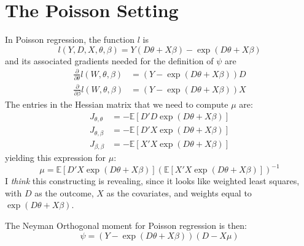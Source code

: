 \documentclass[11pt]{article}
\begin{document}
\section{The Poisson Setting}
In Poisson regression, the function $l$ is
\begin{equation*}
	l(Y, D, X, \theta, \beta) = Y(D\theta + X\beta) - \exp(D\theta + X\beta)
\end{equation*}
and its associated gradients needed for the definition of $\psi$ are
\begin{align*}
	\frac{\partial}{\partial \theta}l(W, \theta, \beta) &= (Y - \exp(D\theta + X\beta)) D \\
	\frac{\partial}{\partial \beta}l(W, \theta, \beta) &= (Y - \exp(D\theta + X\beta)) X
\end{align*}
The entries in the Hessian matrix that we need to compute $\mu$ are:
\begin{align*}
	J_{\theta, \theta} &= -\mathbb{E}\left[D'D\exp(D\theta + X\beta)\right] \\
	J_{\theta, \beta} &= -\mathbb{E}\left[D'X\exp(D\theta + X\beta)\right] \\
	J_{\beta, \beta} &= -\mathbb{E}\left[X'X\exp(D\theta + X\beta)\right]
\end{align*} 
yielding this expression for $\mu$:
\begin{equation*}
	\mu = \mathbb{E}\left[D'X\exp(D\theta + X\beta)\right]\left(\mathbb{E}\left[X'X\exp(D\theta + X\beta)\right]\right)^{-1}
\end{equation*}
I \textit{think} this constructing is revealing, since it looks like weighted least squares, with $D$ as the outcome, $X$ as the covariates, and weights equal to $\exp(D\theta + X\beta)$. 

The Neyman Orthogonal moment for Poisson regression is then:
\begin{equation*}
	\psi = (Y - \exp(D\theta + X\beta))(D - X\mu)
\end{equation*}
\end{document}
